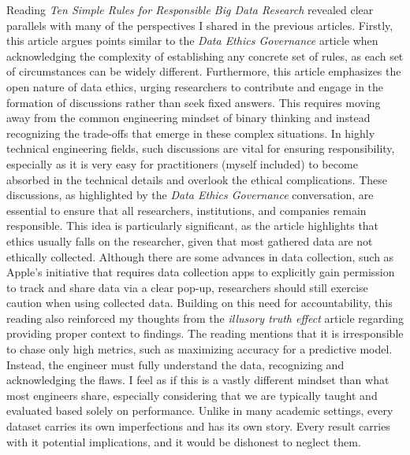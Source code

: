 \documentclass[12pt]{article}
\begin{document}
\begin{text}
Reading \textit{Ten Simple Rules for Responsible Big Data Research} revealed clear parallels with many of the perspectives I shared in the previous articles. Firstly, this article argues points similar to the \textit{Data Ethics Governance} article when acknowledging the complexity of establishing any concrete set of rules, as each set of circumstances can be widely different. Furthermore, this article emphasizes the open nature of data ethics, urging researchers to contribute and engage in the formation of discussions rather than seek fixed answers. This requires moving away from the common engineering mindset of binary thinking and instead recognizing the trade-offs that emerge in these complex situations. In highly technical engineering fields, such discussions are vital for ensuring responsibility, especially as it is very easy for practitioners (myself included) to become absorbed in the technical details and overlook the ethical complications. These discussions, as highlighted by the \textit{Data Ethics Governance} conversation, are essential to ensure that all researchers, institutions, and companies remain responsible. This idea is particularly significant, as the article highlights that ethics usually falls on the researcher, given that most gathered data are not ethically collected. Although there are some advances in data collection, such as Apple's initiative that requires data collection apps to explicitly gain permission to track and share data via a clear pop-up, researchers should still exercise caution when using collected data. Building on this need for accountability, this reading also reinforced my thoughts from the \textit{illusory truth effect} article regarding providing proper context to findings. The reading mentions that it is irresponsible to chase only high metrics, such as maximizing accuracy for a predictive model. Instead, the engineer must fully understand the data, recognizing and acknowledging the flaws. I feel as if this is a vastly different mindset than what most engineers share, especially considering that we are typically taught and evaluated based solely on performance. Unlike in many academic settings, every dataset carries its own imperfections and has its own story. Every result carries with it potential implications, and it would be dishonest to neglect them. 


\end{text}
\end{document}
